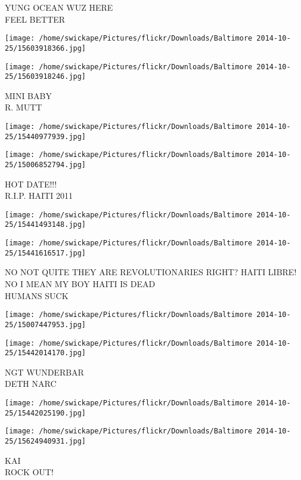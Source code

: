 \documentclass[10pt,letterpaper]{article}
\begin{document}
YUNG OCEAN WUZ HERE\\
FEEL BETTER
\pagebreak

\texttt{[image: /home/swickape/Pictures/flickr/Downloads/Baltimore 2014-10-25/15603918366.jpg]}

\vspace{0.25in}
\texttt{[image: /home/swickape/Pictures/flickr/Downloads/Baltimore 2014-10-25/15603918246.jpg]}

MINI BABY\\
R. MUTT
\pagebreak

\texttt{[image: /home/swickape/Pictures/flickr/Downloads/Baltimore 2014-10-25/15440977939.jpg]}

\vspace{0.25in}
\texttt{[image: /home/swickape/Pictures/flickr/Downloads/Baltimore 2014-10-25/15006852794.jpg]}

HOT DATE!!!\\
R.I.P. HAITI 2011
\pagebreak

\texttt{[image: /home/swickape/Pictures/flickr/Downloads/Baltimore 2014-10-25/15441493148.jpg]}

\vspace{0.25in}
\texttt{[image: /home/swickape/Pictures/flickr/Downloads/Baltimore 2014-10-25/15441616517.jpg]}

NO NOT QUITE THEY ARE REVOLUTIONARIES RIGHT?  HAITI LIBRE!  NO I MEAN MY BOY HAITI IS DEAD\\
HUMANS SUCK
\pagebreak

\texttt{[image: /home/swickape/Pictures/flickr/Downloads/Baltimore 2014-10-25/15007447953.jpg]}

\vspace{0.25in}
\texttt{[image: /home/swickape/Pictures/flickr/Downloads/Baltimore 2014-10-25/15442014170.jpg]}

NGT WUNDERBAR\\
DETH NARC
\pagebreak

\texttt{[image: /home/swickape/Pictures/flickr/Downloads/Baltimore 2014-10-25/15442025190.jpg]}

\vspace{0.25in}
\texttt{[image: /home/swickape/Pictures/flickr/Downloads/Baltimore 2014-10-25/15624940931.jpg]}

KAI\\
ROCK OUT!
\pagebreak
\end{document}
